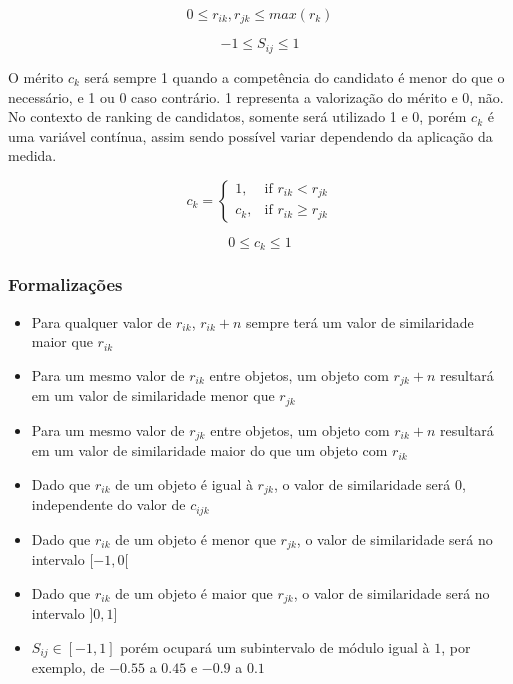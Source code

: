 \documentclass[preprint,12pt]{elsarticle}
\begin{document}
\begin{equation}
0 \leq r_{ik}, r_{jk} \leq max(r_k)
\end{equation}

\begin{equation}
-1 \leq S_{ij} \leq 1
\end{equation}

O mérito $c_{k}$ será sempre 1 quando a competência do candidato é menor do que o necessário, e 1 ou 0 caso contrário. 1 representa a valorização do mérito e 0, não. No contexto de ranking de candidatos, somente será utilizado 1 e 0, porém $c_{k}$ é uma variável contínua, assim sendo possível variar dependendo da aplicação da medida.

\begin{equation}
c_{k} = \begin{cases} 1, & \text{if } r_{ik} < r_{jk} \\ c_{k}, & \text{if } r_{ik} \geq r_{jk} \end{cases}
\end{equation}

\begin{equation}
0 \leq c_k \leq 1
\end{equation}

\subsubsection{Formalizações}

\begin{itemize}
\item Para qualquer valor de $r_{ik}$,   $r_{ik} + n$ sempre terá um valor de similaridade maior que  $r_{ik}$
\item Para um mesmo valor de $r_{ik}$ entre objetos, um objeto com $r_{jk} + n$ resultará em um valor de similaridade menor que $r_{jk}$
\item Para um mesmo valor de $r_{jk}$ entre objetos, um objeto com $r_{ik} + n$ resultará em um valor de similaridade maior do que um objeto com $r_{ik}$
\item Dado que $r_{ik}$ de um objeto é igual à $r_{jk}$, o valor de similaridade será $0$, independente do valor de $c_{ijk}$ 
\item Dado que $r_{ik}$ de um objeto é menor que $r_{jk}$, o valor de similaridade será no intervalo $[-1, 0[$ 
\item Dado que $r_{ik}$ de um objeto é maior que $r_{jk}$, o valor de similaridade será no intervalo $]0, 1]$
\item $S_{ij} \in [-1,1]$ porém ocupará um subintervalo de módulo igual à $1$, por exemplo, de $-0.55$ a  $0.45$ e  $-0.9$ a $0.1$
\end{itemize}
\end{document}
